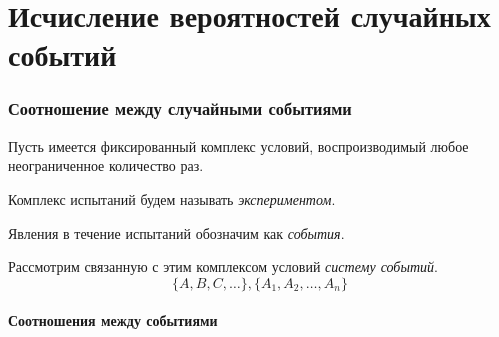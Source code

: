 \part{Исчисление вероятностей случайных событий}
\section{Соотношение между случайными событиями}
Пусть имеется фиксированный комплекс условий, воспроизводимый любое неограниченное количество раз.

\begin{definition}
  Комплекс испытаний будем называть \textit{экспериментом}.
\end{definition}

\begin{definition}
  Явления в течение испытаний обозначим как \textit{события}.
\end{definition}

Рассмотрим связанную с этим комплексом условий \textit{систему событий}.
\[
  \{A, B, C, \dots\},
  \{A_1, A_2, \dots, A_n\}
\]

\subsection{Соотношения между событиями}

